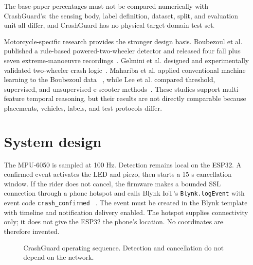 \documentclass[12pt,a4paper]{article}
\begin{document}
The base-paper percentages must not be compared numerically with CrashGuard's:
the sensing body, label definition, dataset, split, and evaluation unit all
differ, and CrashGuard has no physical target-domain test set.

Motorcycle-specific research provides the stronger design basis. Boubezoul
et al. published a rule-based powered-two-wheeler detector and released four
fall plus seven extreme-manoeuvre recordings~\cite{boubezoul2013algorithm,
boubezoul2019dataset}. Gelmini et al. designed and experimentally validated
two-wheeler crash logic~\cite{gelmini2019validation,gelmini2021novel}.
Mahariba et al. applied conventional machine learning to the Boubezoul data
~\cite{mahariba2022ml}, while Lee et al. compared threshold, supervised, and
unsupervised e-scooter methods~\cite{lee2024escooter}. These studies support
multi-feature temporal reasoning, but their results are not directly
comparable because placements, vehicles, labels, and test protocols differ.

\section{System design}

The MPU-6050 is sampled at 100 Hz. Detection remains local on the ESP32. A
confirmed event activates the LED and piezo, then starts a 15 s cancellation
window. If the rider does not cancel, the firmware makes a bounded SSL
connection through a phone hotspot and calls Blynk IoT's
\texttt{Blynk.logEvent} with event code \texttt{crash\_confirmed}
~\cite{blynkevents}. The event must be created in the Blynk template with
timeline and notification delivery enabled. The hotspot supplies connectivity only;
it does not give the ESP32 the phone's location. No coordinates are therefore
invented.

\begin{figure}[H]
\centering
{}
\caption{CrashGuard operating sequence. Detection and cancellation do not
depend on the network.}
\label{fig:architecture}
\end{figure}
\end{document}
